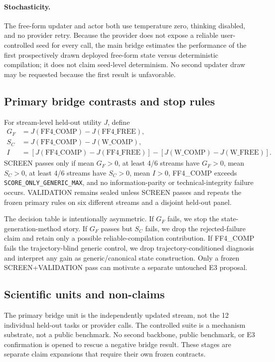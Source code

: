 \paragraph{Stochasticity.}
The free-form updater and actor both use temperature zero, thinking disabled, and no provider retry. Because the provider does not expose a reliable user-controlled seed for every call, the main bridge estimates the performance of the first prospectively drawn deployed free-form state versus deterministic compilation; it does not claim seed-level determinism. No second updater draw may be requested because the first result is unfavorable.

\subsection{Primary bridge contrasts and stop rules}
For stream-level held-out utility $J$, define
\begin{align}
G_F &= J(\text{FF4\_COMP})-J(\text{FF4\_FREE}),\\
S_C &= J(\text{FF4\_COMP})-J(\text{W\_COMP}),\\
I &= [J(\text{FF4\_COMP})-J(\text{FF4\_FREE})]
 -[J(\text{W\_COMP})-J(\text{W\_FREE})].
\end{align}
SCREEN passes only if mean $G_F>0$, at least 4/6 streams have $G_F>0$, mean $S_C>0$, at least 4/6 streams have $S_C>0$, mean $I>0$, FF4\_COMP exceeds \texttt{SCORE\_ONLY\_GENERIC\_MAX}, and no information-parity or technical-integrity failure occurs. VALIDATION remains sealed unless SCREEN passes and repeats the frozen primary rules on six different streams and a disjoint held-out panel.

The decision table is intentionally asymmetric. If $G_F$ fails, we stop the state-generation-method story. If $G_F$ passes but $S_C$ fails, we drop the rejected-failure claim and retain only a possible reliable-compilation contribution. If FF4\_COMP fails the trajectory-blind generic control, we drop trajectory-conditioned diagnosis and interpret any gain as generic/canonical state construction. Only a frozen SCREEN+VALIDATION pass can motivate a separate untouched E3 proposal.

\subsection{Scientific units and non-claims}
The primary bridge unit is the independently updated stream, not the 12 individual held-out tasks or provider calls. The controlled suite is a mechanism substrate, not a public benchmark. No second backbone, public benchmark, or E3 confirmation is opened to rescue a negative bridge result. These stages are separate claim expansions that require their own frozen contracts.
